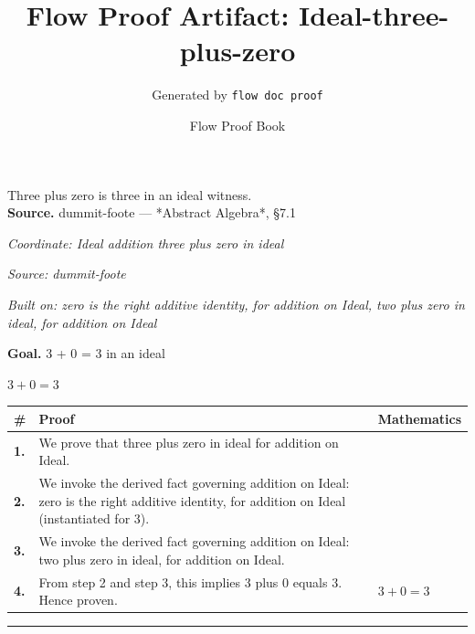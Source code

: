 \documentclass[11pt]{article}
\title{Flow Proof Artifact: Ideal-three-plus-zero}
\author{Generated by \texttt{flow doc proof}}
\date{Flow Proof Book}
\theoremstyle{definition}
\begin{document}
\maketitle
Three plus zero is three in an ideal witness.\\[0.5em]
\textbf{Source.} dummit-foote — *Abstract Algebra*, §7.1\\[0.5em]
\bigskip
{}\par
\smallskip\noindent\textit{Coordinate: Ideal \cdot addition \cdot three plus zero in ideal}\par
\smallskip\noindent\textit{Source: dummit-foote}\par
\smallskip\noindent\textit{Built on: zero is the right additive identity, for addition on Ideal, two plus zero in ideal, for addition on Ideal}\par
\medskip
\noindent\textbf{Goal.} 3 + 0 = 3 in an ideal\par
\noindent$\displaystyle 3 + 0 = 3$\par
\medskip
\noindent
\begin{tabular}{@{} >{\raggedright\arraybackslash}p{} >{\raggedright\arraybackslash}p{} >{\raggedleft\arraybackslash}p{} @{}}
\textbf{\#} & \textbf{Proof} & \textbf{Mathematics} \\
\midrule
\textbf{1.} & We prove that three plus zero in ideal for addition on Ideal. & \\[0.45em]
\textbf{2.} & We invoke the derived fact governing addition on Ideal: zero is the right additive identity, for addition on Ideal (instantiated for 3). & \\[0.45em]
\textbf{3.} & We invoke the derived fact governing addition on Ideal: two plus zero in ideal, for addition on Ideal. & \\[0.45em]
\textbf{4.} & From step 2 and step 3, this implies 3 plus 0 equals 3. Hence proven. & $\displaystyle 3 + 0 = 3$ \\[0.45em]
\bottomrule
\end{tabular}
\label{thm:Ideal-addition-three_plus_zero_in_ideal}
\par\medskip\hrule
\end{document}
